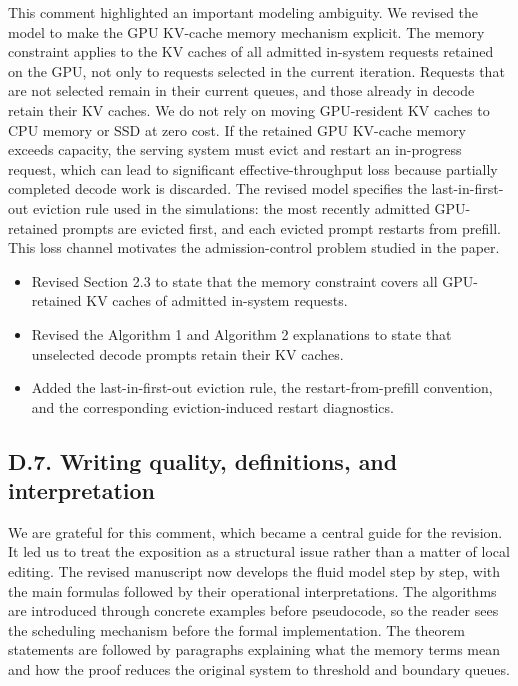 
\response This comment highlighted an important modeling ambiguity. We revised the model to make the GPU KV-cache memory mechanism explicit. The memory constraint applies to the KV caches of all admitted in-system requests retained on the GPU, not only to requests selected in the current iteration. Requests that are not selected remain in their current queues, and those already in decode retain their KV caches. We do not rely on moving GPU-resident KV caches to CPU memory or SSD at zero cost. If the retained GPU KV-cache memory exceeds capacity, the serving system must evict and restart an in-progress request, which can lead to significant effective-throughput loss because partially completed decode work is discarded. The revised model specifies the last-in-first-out eviction rule used in the simulations: the most recently admitted GPU-retained prompts are evicted first, and each evicted prompt restarts from prefill. This loss channel motivates the admission-control problem studied in the paper.

\changes
\begin{itemize}
    \item Revised Section 2.3 to state that the memory constraint covers all GPU-retained KV caches of admitted in-system requests.
    \item Revised the Algorithm 1 and Algorithm 2 explanations to state that unselected decode prompts retain their KV caches.
    \item Added the last-in-first-out eviction rule, the restart-from-prefill convention, and the corresponding eviction-induced restart diagnostics.
\end{itemize}

\subsection*{D.7. Writing quality, definitions, and interpretation}


\response We are grateful for this comment, which became a central guide for the revision. It led us to treat the exposition as a structural issue rather than a matter of local editing. The revised manuscript now develops the fluid model step by step, with the main formulas followed by their operational interpretations. The algorithms are introduced through concrete examples before pseudocode, so the reader sees the scheduling mechanism before the formal implementation. The theorem statements are followed by paragraphs explaining what the memory terms mean and how the proof reduces the original system to threshold and boundary queues.

